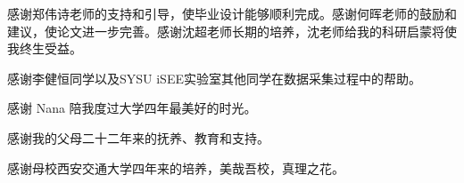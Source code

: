 
感谢郑伟诗老师的支持和引导，使毕业设计能够顺利完成。感谢何晖老师的鼓励和建议，使论文进一步完善。感谢沈超老师长期的培养，沈老师给我的科研启蒙将使我终生受益。

感谢李健恒同学以及SYSU iSEE实验室其他同学在数据采集过程中的帮助。

感谢 Nana 陪我度过大学四年最美好的时光。

感谢我的父母二十二年来的抚养、教育和支持。

感谢母校西安交通大学四年来的培养，美哉吾校，真理之花。

\cleardoublepage